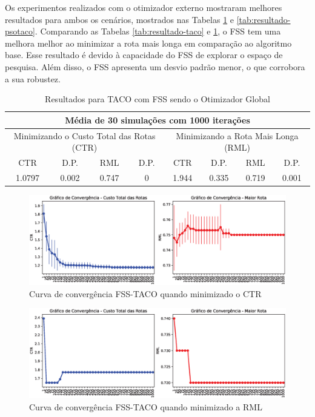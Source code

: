 Os experimentos realizados com o otimizador externo mostraram melhores resultados para ambos os cenários, mostrados nas Tabelas \ref{tab:resultado-fsstaco} e \ref{tab:resultado-psotaco}. Comparando as Tabelas \ref{tab:resultado-taco} e \ref{tab:resultado-fsstaco}, o FSS tem uma melhora melhor ao minimizar a rota mais longa em comparação ao algoritmo base. Esse resultado é devido à capacidade do FSS de explorar o espaço de pesquisa. Além disso, o FSS apresenta um desvio padrão menor, o que corrobora a sua robustez.

\begin{table}[htb]
    \centering
    \caption{Resultados para TACO com FSS sendo o Otimizador Global} \label{tab:resultado-fsstaco}
\begin{tabular}{|c|c|c|c|c|c|c|c|}
\hline
\multicolumn{8}{|c|}{Média de 30 simulações com 1000 iterações}                                                            \\ \hline
\multicolumn{4}{|c|}{Minimizando o Custo Total das Rotas (CTR)} & \multicolumn{4}{c|}{Minimizando a Rota Mais Longa (RML)} \\ \hline
CTR             & D.P.           & RML           & D.P.         & CTR          & D.P.         & RML          & D.P.        \\ \hline
1.0797          & 0.002          & 0.747         & 0            & 1.944        & 0.335        & 0.719        & 0.001       \\ \hline
\end{tabular}
\end{table}

\begin{figure}[htb]
    \centering
    \includegraphics[width=\textwidth]{imagens/convergence-totalcost-fsstaco.eps}
    \caption{Curva de convergência FSS-TACO quando minimizado o CTR} \label{fig:resultados-convergencia-fss-tcr}
\end{figure}

\begin{figure}[htb]
    \centering
    \includegraphics[width=\textwidth]{imagens/convergence-maxcost-fsstaco.eps}
    \caption{Curva de convergência FSS-TACO quando minimizado a RML} \label{fig:resultados-convergencia-fss-rml}
\end{figure}

